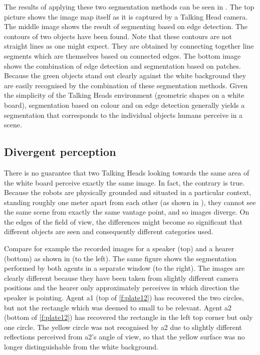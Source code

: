 The results of applying these two segmentation methods
can be seen in . 
The top picture shows the image map itself as it is captured by 
a Talking Head camera. The middle image shows the result of 
segmenting based on edge detection. The contours of two 
objects have been found. Note that these contours are not 
straight lines as one might expect. They are obtained by 
connecting together line segments which are themselves 
based on connected edges. The bottom image shows the combination of 
edge detection and segmentation based on patches. Because the green 
objects stand out clearly against the white background
they are easily recognised by the combination of 
these segmentation methods. Given the simplicity of the Talking Heads
environment (geometric shapes on a white board),
segmentation based on colour and on edge detection
generally yields a segmentation that corresponds 
to the individual objects humans perceive in a scene. 

\subsection{Divergent perception}

There is no guarantee that two Talking Heads
looking towards the same area of the white board
perceive exactly the same image. In fact, the contrary 
is true. Because the robots are physically grounded 
and situated in a particular context, standing roughly one 
meter apart from each other (as shown in ), they cannot 
see the same scene from exactly the same vantage point, and 
so images diverge. On the edges of the field of view, 
the differences might become so significant that 
different objects are seen and consequently different
categories used. 

Compare for example the recorded images for a speaker (top)
and a hearer (bottom) as shown in  (to the 
left). The same figure shows the segmentation performed by 
both agents in a separate window (to the right). The images
are clearly different because they have been taken from 
slightly different camera positions and the hearer only approximately
perceives in which direction the speaker is pointing. 
Agent {\bfshape a1} (top of \ref{f:plate12}) has recovered the two circles, but
not the rectangle which was deemed to small to be relevant. 
Agent {\bfshape a2} (bottom of \ref{f:plate12}) has recovered the rectangle 
in the left top corner but only one circle. The yellow circle
was not recognised by {\bfshape a2} due to slightly different 
reflections perceived from {\bfshape a2}'s angle of view, so that the yellow 
surface was no longer distinguishable from the white background. 

